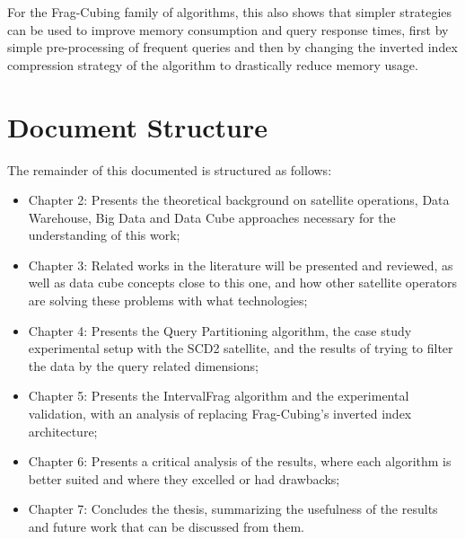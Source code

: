 For the Frag-Cubing family of algorithms, this also shows that simpler strategies can be used to improve memory consumption and query response times, first by simple pre-processing of frequent queries and then by changing the inverted index compression strategy of the algorithm to drastically reduce memory usage.

\section{Document Structure}\label{ch:intro:org}

The remainder of this documented is structured as follows:

\begin{itemize}[noitemsep]
  \item{Chapter 2}: Presents the theoretical background on satellite operations, Data Warehouse, Big Data and Data Cube approaches necessary for the understanding of this work;
  \item{Chapter 3}: Related works in the literature will be presented and reviewed, as well as data cube concepts close to this one, and how other satellite operators are solving these problems with what technologies;
  \item{Chapter 4}: Presents the Query Partitioning algorithm, the case study experimental setup with the SCD2 satellite, and the results of trying to filter the data by the query related dimensions;
  \item{Chapter 5}: Presents the IntervalFrag algorithm and the experimental validation, with an analysis of replacing Frag-Cubing's inverted index architecture;
  \item{Chapter 6}: Presents a critical analysis of the results, where each algorithm is better suited and where they excelled or had drawbacks;
  \item{Chapter 7}: Concludes the thesis, summarizing the usefulness of the results and future work that can be discussed from them.
\end{itemize}

